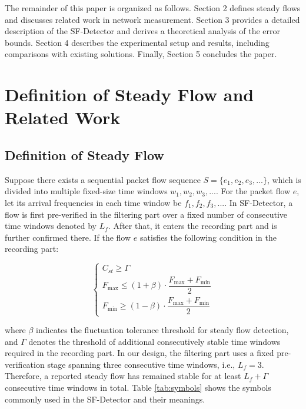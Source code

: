 \documentclass[preprint,12pt]{elsarticle}
\begin{document}
The remainder of this paper is organized as follows. Section 2 defines steady flows and discusses related work in network measurement. Section 3 provides a detailed description of the SF-Detector and derives a theoretical analysis of the error bounds. Section 4 describes the experimental setup and results, including comparisons with existing solutions. Finally, Section 5 concludes the paper.

\section{Definition of Steady Flow and Related Work}

\subsection{Definition of Steady Flow}
Suppose there exists a sequential packet flow sequence $S=\{e_{1},e_{2},e_{3},...\}$, which is divided into multiple fixed-size time windows $w_1, w_2, w_3, ...$. For the packet flow $e$, let its arrival frequencies in each time window be $f_{1},f_{2},f_{3},...$. In SF-Detector, a flow is first pre-verified in the filtering part over a fixed number of consecutive time windows denoted by $L_f$. After that, it enters the recording part and is further confirmed there. If the flow $e$ satisfies the following condition in the recording part:

\begin{equation}
    \begin{cases}
    C_{st} \ge \Gamma \\[6pt]
    F_{\max} \le (1+\beta) \cdot \dfrac{F_{\max} + F_{\min}}{2} \\[8pt]
    F_{\min} \ge (1-\beta) \cdot \dfrac{F_{\max} + F_{\min}}{2}
    \end{cases}
    \label{eq:stability}
\end{equation}

where $\beta$ indicates the fluctuation tolerance threshold for steady flow detection, and $\Gamma$ denotes the threshold of additional consecutively stable time windows required in the recording part. In our design, the filtering part uses a fixed pre-verification stage spanning three consecutive time windows, i.e., $L_f = 3$. Therefore, a reported steady flow has remained stable for at least $L_f + \Gamma$ consecutive time windows in total. Table \ref{tab:symbols} shows the symbols commonly used in the SF-Detector and their meanings.
\end{document}

